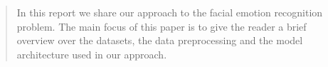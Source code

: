 \begin{abstract}
    In this report we share our approach to the facial emotion 
    recognition problem. The main focus of this paper is to give the 
    reader a brief overview over the datasets, the data preprocessing and 
    the model architecture used in our approach.
\end{abstract}